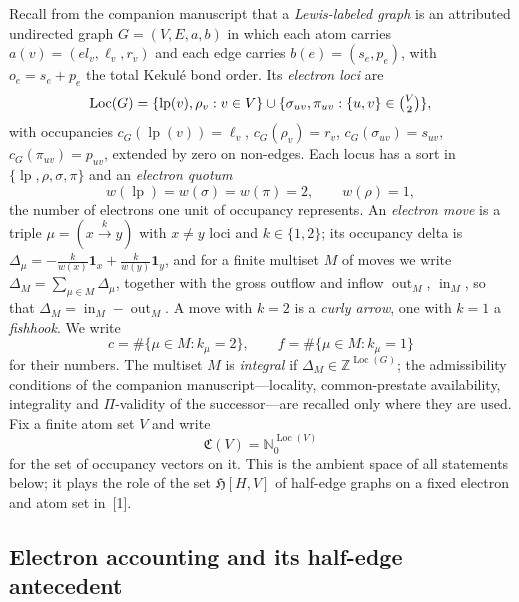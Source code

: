 \documentclass[11pt]{article}
\numberwithin{equation}{section}
\newcommand{\Loc}{\operatorname{Loc}}
\newcommand{\gout}{\operatorname{out}}
\newcommand{\gin}{\operatorname{in}}
\newcommand{\lp}{\operatorname{lp}}
\newcommand{\Occ}{\mathfrak{C}}
\theoremstyle{plain}
\theoremstyle{definition}
\theoremstyle{remark}
\begin{document}
Recall from the companion manuscript that a \emph{Lewis-labeled graph} is an
attributed undirected graph $G=(V,E,a,b)$ in which each atom carries
$a(v)=(el_v,\ell_v,r_v)$ and each edge carries $b(e)=(s_e,p_e)$, with
$o_e=s_e+p_e$ the total Kekul\'e bond order.  Its \emph{electron loci} are
\begin{equation}
  \Loc(G)=\{\lp(v),\rho_v: v\in V\}\cup
          \{\sigma_{uv},\pi_{uv}: \{u,v\}\in\tbinom{V}{2}\},
  \label{eq:loci}
\end{equation}
with occupancies $c_G(\lp(v))=\ell_v$, $c_G(\rho_v)=r_v$,
$c_G(\sigma_{uv})=s_{uv}$, $c_G(\pi_{uv})=p_{uv}$, extended by zero on
non-edges.  Each locus has a sort in $\{\lp,\rho,\sigma,\pi\}$ and an
\emph{electron quotum}
\begin{equation}
  w(\lp)=w(\sigma)=w(\pi)=2,\qquad w(\rho)=1 ,
  \label{eq:quota}
\end{equation}
the number of electrons one unit of occupancy represents.  An \emph{electron
move} is a triple $\mu=(x\xrightarrow{k}y)$ with $x\neq y$ loci and
$k\in\{1,2\}$; its occupancy delta is $\Delta_\mu=-\tfrac{k}{w(x)}\mathbf1_x
+\tfrac{k}{w(y)}\mathbf1_y$, and for a finite multiset $M$ of moves we write
$\Delta_M=\sum_{\mu\in M}\Delta_\mu$, together with the gross outflow and
inflow $\gout_M$, $\gin_M$, so that $\Delta_M=\gin_M-\gout_M$.  A move with $k=2$ is
a \emph{curly arrow}, one with $k=1$ a \emph{fishhook}.  We write
\begin{equation}
  c=\#\{\mu\in M: k_\mu=2\},\qquad f=\#\{\mu\in M: k_\mu=1\}
  \label{eq:arrow-counts}
\end{equation}
for their numbers.  The multiset $M$ is \emph{integral} if
$\Delta_M\in\mathbb Z^{\Loc(G)}$; the admissibility conditions of the
companion manuscript---locality, common-prestate availability, integrality and
$\Pi$-validity of the successor---are recalled only where they are used.
Fix a finite atom set $V$ and write
\begin{equation}
  \Occ(V)=\mathbb N_0^{\Loc(V)}
  \label{eq:occ-space}
\end{equation}
for the set of occupancy vectors on it.  This is the ambient space of all
statements below; it plays the role of the set $\mathfrak H[H,V]$ of half-edge
graphs on a fixed electron and atom set in~[1].

\subsection{Electron accounting and its half-edge antecedent}
\end{document}
